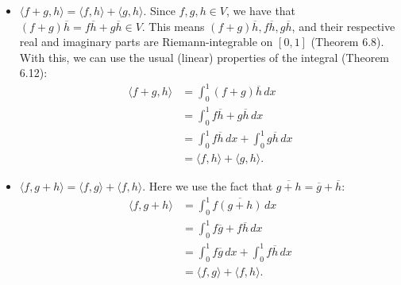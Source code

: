 \documentclass[11pt]{article}
\begin{document}
\begin{enumerate}[(a)]
\begin{itemize}
		\item $\boxed{\langle f+g ,h \rangle  = \langle f,h \rangle + \langle g,h\rangle}$. Since $f,g,h\in V$, we have that $(f+g)\overline{h} = f\overline{h} + g\overline{h} \in V$. This means $(f+g)\overline{h}, f\overline{h}, g\overline{h}$, and their respective real and imaginary parts are Riemann-integrable on $[0,1]$ (Theorem 6.8). With this, we can use the usual (linear) properties of the integral (Theorem 6.12):
		\begin{align*}
		\langle f+g,h\rangle &= \int^1_0 (f+g)\overline{h}\,dx\\
		&= \int^1_0 f\overline{h} + g\overline{h}\,dx\\
		&= \int^1_0 f\overline{h}\,dx + \int^1_0 g\overline{h}\,dx\\
		&= \langle f,h\rangle + \langle g,h\rangle.
		\end{align*}
		
		
		\item $\boxed{\langle f, g+h \rangle  = \langle f,g \rangle + \langle f,h\rangle}$. Here we use the fact that $\overline{g+h} = \overline{g} + \overline{h}$:
		\begin{align*}
		\langle f, g+h\rangle &= \int^1_0 f\overline{(g+h)}\,dx\\
		&= \int^1_0 f\overline{g} + f\overline{h}\,dx\\
		&= \int^1_0 f\overline{g}\,dx + \int^1_0 f\overline{h}\,dx\\
		&= \langle f,g\rangle + \langle f,h\rangle.
		\end{align*}
		

\end{itemize}
\end{enumerate}
\end{document}
